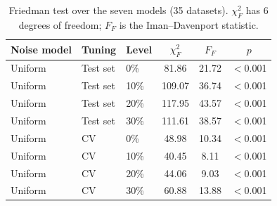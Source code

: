 \begin{table}[!t]
\centering
\caption{Friedman test over the seven models (35 datasets). $\chi^2_F$ has 6 degrees of freedom; $F_F$ is the Iman--Davenport statistic.}
\label{tab:friedman}
\small
\begin{tabular}{lllccc}
\toprule
Noise model & Tuning & Level & $\chi^2_F$ & $F_F$ & $p$ \\
\midrule
Uniform & Test set & 0\% & 81.86 & 21.72 & $<$0.001 \\
Uniform & Test set & 10\% & 109.07 & 36.74 & $<$0.001 \\
Uniform & Test set & 20\% & 117.95 & 43.57 & $<$0.001 \\
Uniform & Test set & 30\% & 111.61 & 38.57 & $<$0.001 \\
Uniform & CV & 0\% & 48.98 & 10.34 & $<$0.001 \\
Uniform & CV & 10\% & 40.45 & 8.11 & $<$0.001 \\
Uniform & CV & 20\% & 44.06 & 9.03 & $<$0.001 \\
Uniform & CV & 30\% & 60.88 & 13.88 & $<$0.001 \\
\bottomrule
\end{tabular}
\end{table}
